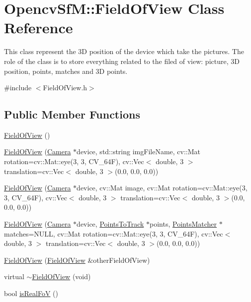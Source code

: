 \hypertarget{class_opencv_sf_m_1_1_field_of_view}{
\section{OpencvSfM::FieldOfView Class Reference}
\label{class_opencv_sf_m_1_1_field_of_view}
}


This class represent the 3D position of the device which take the pictures. The role of the class is to store everything related to the filed of view: picture, 3D position, points, matches and 3D points.  




{\ttfamily \#include $<$FieldOfView.h$>$}

\subsection*{Public Member Functions}
\begin{DoxyCompactItemize}
\item 
\hyperlink{class_opencv_sf_m_1_1_field_of_view_a28445368ae4bb987cbd12556cf507489}{FieldOfView} ()
\item 
\hyperlink{class_opencv_sf_m_1_1_field_of_view_af5840e7345294668ed5adda8b66cb801}{FieldOfView} (\hyperlink{class_opencv_sf_m_1_1_camera}{Camera} $\ast$device, std::string imgFileName, cv::Mat rotation=cv::Mat::eye(3, 3, CV\_\-64F), cv::Vec$<$ double, 3 $>$ translation=cv::Vec$<$ double, 3 $>$(0.0, 0.0, 0.0))
\item 
\hyperlink{class_opencv_sf_m_1_1_field_of_view_ad7f1e3fcb46cacb23de274ea0626e7ab}{FieldOfView} (\hyperlink{class_opencv_sf_m_1_1_camera}{Camera} $\ast$device, cv::Mat image, cv::Mat rotation=cv::Mat::eye(3, 3, CV\_\-64F), cv::Vec$<$ double, 3 $>$ translation=cv::Vec$<$ double, 3 $>$(0.0, 0.0, 0.0))
\item 
\hyperlink{class_opencv_sf_m_1_1_field_of_view_a55c9d18ac6dc35027bf007ed8c6787da}{FieldOfView} (\hyperlink{class_opencv_sf_m_1_1_camera}{Camera} $\ast$device, \hyperlink{class_opencv_sf_m_1_1_points_to_track}{PointsToTrack} $\ast$points, \hyperlink{class_opencv_sf_m_1_1_points_matcher}{PointsMatcher} $\ast$matches=NULL, cv::Mat rotation=cv::Mat::eye(3, 3, CV\_\-64F), cv::Vec$<$ double, 3 $>$ translation=cv::Vec$<$ double, 3 $>$(0.0, 0.0, 0.0))
\item 
\hyperlink{class_opencv_sf_m_1_1_field_of_view_ab9ac603aaea80b30ccfe20279b2453a3}{FieldOfView} (\hyperlink{class_opencv_sf_m_1_1_field_of_view}{FieldOfView} \&otherFieldOfView)
\item 
virtual \hyperlink{class_opencv_sf_m_1_1_field_of_view_a15cdc4b6936cfd126419c68be464342b}{$\sim$FieldOfView} (void)
\item 
bool \hyperlink{class_opencv_sf_m_1_1_field_of_view_a6617003b67eda0d09b8da81ed7dad83d}{isRealFoV} ()
\end{DoxyCompactItemize}
